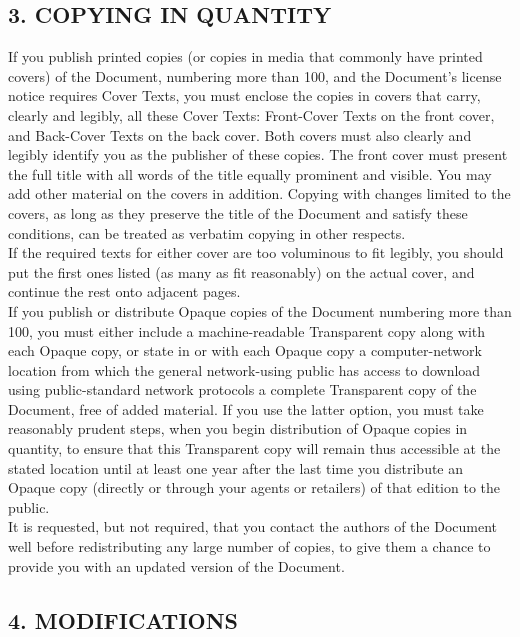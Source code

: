 \subsection{3. COPYING IN QUANTITY}



If you publish printed copies (or copies in media that commonly have printed covers) of the Document, numbering more than 100, and the Document's license notice requires Cover Texts, you must enclose the copies in covers that carry, clearly and legibly, all these Cover Texts: Front-Cover Texts on the front cover, and Back-Cover Texts on the back cover. Both covers must also clearly and legibly identify you as the publisher of these copies. The front cover must present the full title with all words of the title equally prominent and visible. You may add other material on the covers in addition. Copying with changes limited to the covers, as long as they preserve the title of the Document and satisfy these conditions, can be treated as verbatim copying in other respects.\\
If the required texts for either cover are too voluminous to fit legibly, you should put the first ones listed (as many as fit reasonably) on the actual cover, and continue the rest onto adjacent pages.\\
If you publish or distribute Opaque copies of the Document numbering more than 100, you must either include a machine-readable Transparent copy along with each Opaque copy, or state in or with each Opaque copy a computer-network location from which the general network-using public has access to download using public-standard network protocols a complete Transparent copy of the Document, free of added material. If you use the latter option, you must take reasonably prudent steps, when you begin distribution of Opaque copies in quantity, to ensure that this Transparent copy will remain thus accessible at the stated location until at least one year after the last time you distribute an Opaque copy (directly or through your agents or retailers) of that edition to the public.\\
It is requested, but not required, that you contact the authors of the Document well before redistributing any large number of copies, to give them a chance to provide you with an updated version of the Document.

\subsection{4. MODIFICATIONS}





